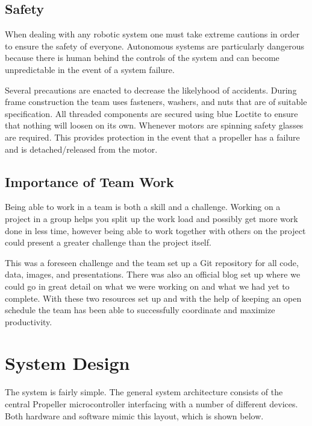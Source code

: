 \documentclass{article}
\numberwithin{equation}{section} %
\begin{document}

\subsection{Safety}

When dealing with any robotic system one must take extreme cautions in order to ensure the safety of everyone. Autonomous systems are particularly dangerous because there is human behind the controls of the system and can become unpredictable in the event of a system failure. 

Several precautions are enacted to decrease the likelyhood of accidents. During frame construction the team uses fasteners, washers, and nuts that are of suitable specification. All threaded components are secured using blue Loctite to ensure that nothing will loosen on its own. Whenever motors are spinning safety glasses are required. This provides protection in the event that a propeller has a failure and is detached/released from the motor.

\subsection{Importance of Team Work}
Being able to work in a team is both a skill and a challenge. Working on a project in a group helps you split up the work load and possibly get more work done in less time, however being able to work together with others on the project could present a greater challenge than the project itself. 

This was a foreseen challenge and the team set up a Git repository for all code, data, images, and presentations. There was also an official blog set up where we could go in great detail on what we were working on and what we had yet to complete. With these two resources set up and with the help of keeping an open schedule the team has been able to successfully coordinate and maximize productivity.



\section{System Design}
The system is fairly simple. The general system architecture consists of the central Propeller microcontroller interfacing with a number of different devices. Both hardware and software mimic this layout, which is shown below.
\end{document}
